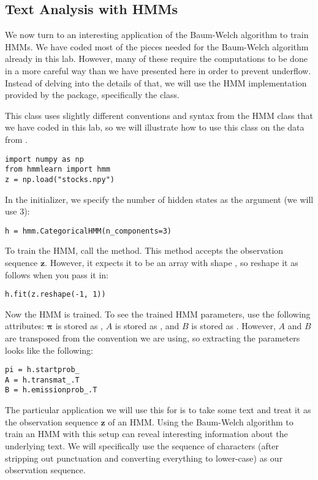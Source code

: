 \subsection*{Text Analysis with HMMs}
We now turn to an interesting application of the Baum-Welch algorithm to train HMMs.
We have coded most of the pieces needed for the Baum-Welch algorithm already in this lab.
However, many of these require the computations to be done in a more careful way than we have presented here in order to prevent underflow.
Instead of delving into the details of that, we will use the HMM implementation provided by the  package, specifically the  class.

This class uses slightly different conventions and syntax from the HMM class that we have coded in this lab, so we will illustrate how to use this class on the data from .
\begin{lstlisting}
import numpy as np
from hmmlearn import hmm
z = np.load("stocks.npy")
\end{lstlisting}
In the initializer, we specify the number of hidden states as the  argument (we will use 3):
\begin{lstlisting}
h = hmm.CategoricalHMM(n_components=3)
\end{lstlisting}
To train the HMM, call the  method.
This method accepts the observation sequence $\mathbf{z}$.
However, it expects it to be an array with shape , so reshape it as follows when you pass it in:
\begin{lstlisting}
h.fit(z.reshape(-1, 1))
\end{lstlisting}
Now the HMM is trained.
To see the trained HMM parameters, use the following attributes:
$\boldsymbol\pi$ is stored as , $A$ is stored as , and $B$ is stored as .
However, $A$ and $B$ are transposed from the convention we are using, so extracting the parameters looks like the following:
\begin{lstlisting}
pi = h.startprob_
A = h.transmat_.T
B = h.emissionprob_.T
\end{lstlisting}

The particular application we will use this for is to take some text and treat it as the observation sequence $\mathbf{z}$ of an HMM.
Using the Baum-Welch algorithm to train an HMM with this setup can reveal interesting information about the underlying text.
We will specifically use the sequence of characters (after stripping out punctuation and converting everything to lower-case) as our observation sequence.

